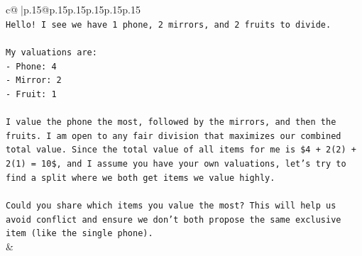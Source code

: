 \documentclass{article}
\begin{document}
{\begin{supertabular}{c@{$\;$}|p{.15\linewidth}@{}p{.15\linewidth}p{.15\linewidth}p{.15\linewidth}p{.15\linewidth}p{.15\linewidth}}
{{{\\ 
\texttt{Hello! I see we have 1 phone, 2 mirrors, and 2 fruits to divide.} \\
\\ 
\texttt{My valuations are:} \\
\texttt{{-} Phone: 4} \\
\texttt{{-} Mirror: 2} \\
\texttt{{-} Fruit: 1} \\
\\ 
\texttt{I value the phone the most, followed by the mirrors, and then the fruits. I am open to any fair division that maximizes our combined total value. Since the total value of all items for me is \$4 + 2(2) + 2(1) = 10\$, and I assume you have your own valuations, let's try to find a split where we both get items we value highly.} \\
\\ 
\texttt{Could you share which items you value the most? This will help us avoid conflict and ensure we don't both propose the same exclusive item (like the single phone).} \\
            }
        }
    }
    & \\ \\


\end{supertabular}}
\end{document}
